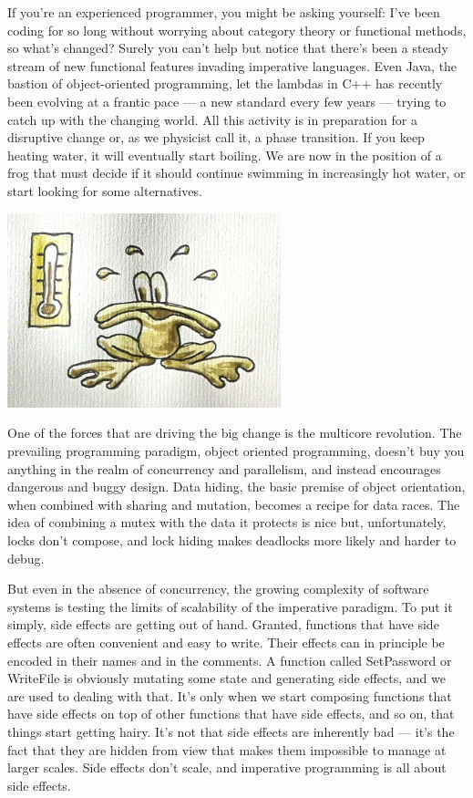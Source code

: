 If you're an experienced programmer, you might be asking yourself: I've
been coding for so long without worrying about category theory or
functional methods, so what's changed? Surely you can't help but notice
that there's been a steady stream of new functional features invading
imperative languages. Even Java, the bastion of object-oriented
programming, let the lambdas in C++ has recently been evolving at a
frantic pace --- a new standard every few years --- trying to catch up
with the changing world. All this activity is in preparation for a
disruptive change or, as we physicist call it, a phase transition. If
you keep heating water, it will eventually start boiling. We are now in
the position of a frog that must decide if it should continue swimming
in increasingly hot water, or start looking for some alternatives.

\includegraphics[width=3.12500in]{images/img_1299.jpg}

One of the forces that are driving the big change is the multicore
revolution. The prevailing programming paradigm, object oriented
programming, doesn't buy you anything in the realm of concurrency and
parallelism, and instead encourages dangerous and buggy design. Data
hiding, the basic premise of object orientation, when combined with
sharing and mutation, becomes a recipe for data races. The idea of
combining a mutex with the data it protects is nice but, unfortunately,
locks don't compose, and lock hiding makes deadlocks more likely and
harder to debug.

But even in the absence of concurrency, the growing complexity of
software systems is testing the limits of scalability of the imperative
paradigm. To put it simply, side effects are getting out of hand.
Granted, functions that have side effects are often convenient and easy
to write. Their effects can in principle be encoded in their names and
in the comments. A function called SetPassword or WriteFile is obviously
mutating some state and generating side effects, and we are used to
dealing with that. It's only when we start composing functions that have
side effects on top of other functions that have side effects, and so
on, that things start getting hairy. It's not that side effects are
inherently bad --- it's the fact that they are hidden from view that
makes them impossible to manage at larger scales. Side effects don't
scale, and imperative programming is all about side effects.

